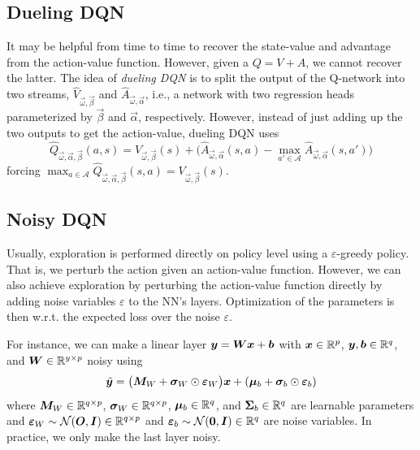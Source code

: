 		\subsection{Dueling \acs{DQN}}
			It may be helpful from time to time to recover the state-value and advantage from the action-value function. However, given a \(Q = V + A\), we cannot recover the latter. The idea of \emph{dueling \ac{DQN}} is to split the output of the Q-network into two streams, \(\hat{V}_{\vec{\omega}, \vec{\beta}}\) and \(\hat{A}_{\vec{\omega}, \vec{\alpha}}\), i.e., a network with two regression heads parameterized by \(\vec{\beta}\) and \(\vec{\alpha}\), respectively. However, instead of just adding up the two outputs to get the action-value, dueling \ac{DQN} uses
			\begin{equation}
				\hat{Q}_{\vec{\omega}, \vec{\alpha}, \vec{\beta}}(a, s) = V_{\vec{\omega}, \vec{\beta}}(s) + \bigl( \hat{A}_{\vec{\omega}, \vec{\alpha}}(s, a) - \max_{a' \in \mathcal{A}} \hat{A}_{\vec{\omega}, \vec{\alpha}}(s, a') \bigr)
			\end{equation}
			forcing \( \max_{a \in \mathcal{A}} \hat{Q}_{\vec{\omega}, \vec{\alpha}, \vec{\beta}}(s, a) = V_{\vec{\omega}, \vec{\beta}}(s) \).

		\subsection{Noisy \acs{DQN}}
			Usually, exploration is performed directly on policy level using a \(\varepsilon\)-greedy policy. That is, we perturb the action given an action-value function. However, we can also achieve exploration by perturbing the action-value function directly by adding noise variables \(\varepsilon\) to the \ac{NN}'s layers. Optimization of the parameters is then w.r.t. the expected loss over the noise \(\varepsilon\).

			For instance, we can make a linear layer \( \bm{y} = \bm{W} \bm{x} + \bm{b} \) with \( \bm{x} \in \mathbb{R}^p \), \( \bm{y}, \bm{b} \in \mathbb{R}^q \), and \( \bm{W} \in \mathbb{R}^{y \times p} \) noisy using
			\begin{equation}
				\tilde{\bm{y}} = \bigl( \bm{M}_W + \bm{\sigma}_W \odot \bm{\varepsilon}_W \bigr) \bm{x} + (\bm{\mu}_b + \bm{\sigma}_b \odot \bm{\varepsilon}_b)
			\end{equation}
			where \( \bm{M}_W \in \mathbb{R}^{q \times p} \), \( \bm{\sigma}_W \in \mathbb{R}^{q \times p} \), \( \bm{\mu}_b \in \mathbb{R}^q \), and \( \bm{\Sigma}_b \in \mathbb{R}^q \) are learnable parameters and \( \bm{\varepsilon}_W \sim \mathcal{N}(\bm{O}, \bm{I}) \in \mathbb{R}^{q \times p} \) and \( \bm{\varepsilon}_b \sim \mathcal{N}(\bm{0}, \bm{I}) \in \mathbb{R}^q \) are noise variables. In practice, we only make the last layer noisy.

